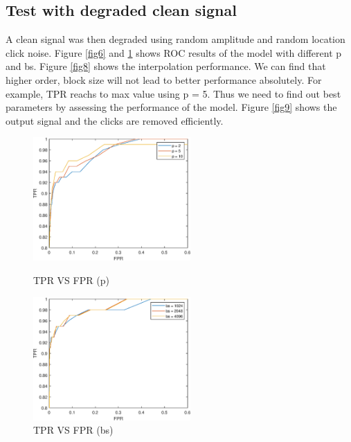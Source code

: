 \documentclass[11pt, a4paper]{article}
\begin{document}
\subsection{Test with degraded clean signal}
A clean signal was then degraded using random amplitude and random location click noise. Figure \ref{fig6} and \ref{fig7} shows ROC results of the model with different p and bs. Figure \ref{fig8} shows the interpolation performance. We can find that higher order, block size will not lead to better performance absolutely. For example, TPR reachs to max value using p = 5. Thus we need to find out best parameters by assessing the performance of the model. Figure \ref{fig9} shows the output signal and the clicks are removed efficiently.

\begin{figure}[h]
	\centering
	\begin{minipage}{0.48\textwidth}
		\centering
		\includegraphics[width=6cm]{fig/fig6}
		\caption{TPR VS FPR (p)}
		\label{fig6}
	\end{minipage}
	\begin{minipage}{0.48\textwidth}
		\centering
		\includegraphics[width=6cm]{fig/fig7}
		\caption{TPR VS FPR (bs)}
		\label{fig7}
	\end{minipage}

\end{figure}
\end{document}
